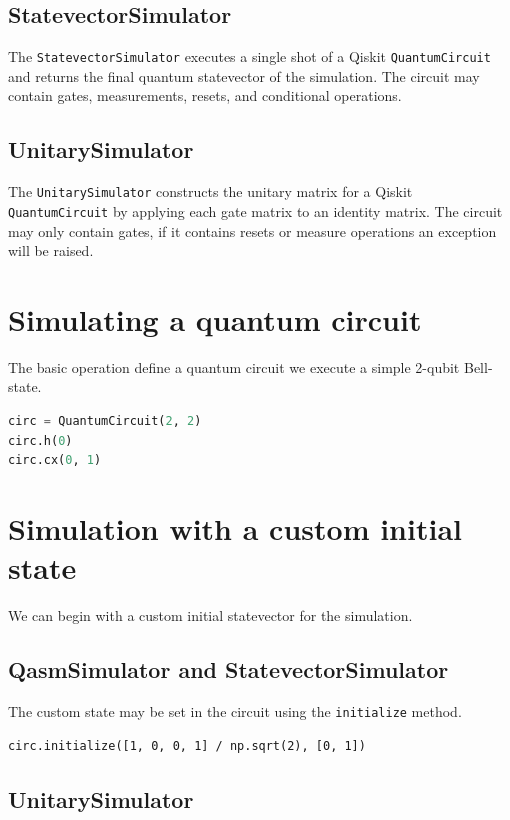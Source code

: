 \documentclass[a4paper,num-refs]{oup-contemporary}
\begin{document}
\subsection{StatevectorSimulator}

The \verb|StatevectorSimulator| executes a single shot of a Qiskit \verb|QuantumCircuit| and returns the final quantum statevector of the simulation. The circuit may contain gates, measurements, resets, and conditional operations.

\subsection{UnitarySimulator}

The \verb|UnitarySimulator| constructs the unitary matrix for a Qiskit \verb|QuantumCircuit| by applying each gate matrix to an identity matrix. The circuit may only contain gates, if it contains resets or measure operations an exception will be raised.

\section{Simulating a quantum circuit}
The basic operation define a quantum circuit we execute a simple 2-qubit Bell-state.

\begin{lstlisting}[language=Python]
circ = QuantumCircuit(2, 2)
circ.h(0)
circ.cx(0, 1)
\end{lstlisting}

\section{Simulation with a custom initial state}
We can begin with a custom initial statevector for the simulation.

\subsection{QasmSimulator and StatevectorSimulator}
The custom state may be set in the circuit using the \verb|initialize| method.

\begin{verbatim}
circ.initialize([1, 0, 0, 1] / np.sqrt(2), [0, 1])
\end{verbatim}

\subsection{UnitarySimulator}
\end{document}
